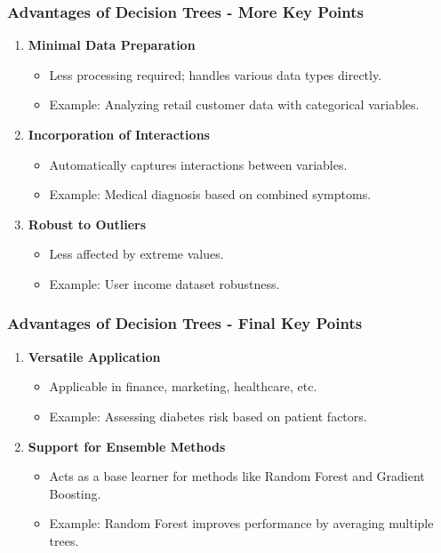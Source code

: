 \documentclass[aspectratio=169]{beamer}
\begin{document}
\begin{frame}[fragile]
    \frametitle{Advantages of Decision Trees - More Key Points}
    \begin{enumerate}[resume]
        \item \textbf{Minimal Data Preparation}
        \begin{itemize}
            \item Less processing required; handles various data types directly.
            \item Example: Analyzing retail customer data with categorical variables.
        \end{itemize}

        \item \textbf{Incorporation of Interactions}
        \begin{itemize}
            \item Automatically captures interactions between variables.
            \item Example: Medical diagnosis based on combined symptoms.
        \end{itemize}

        \item \textbf{Robust to Outliers}
        \begin{itemize}
            \item Less affected by extreme values.
            \item Example: User income dataset robustness.
        \end{itemize}
    \end{enumerate}
\end{frame}

\begin{frame}[fragile]
    \frametitle{Advantages of Decision Trees - Final Key Points}
    \begin{enumerate}[resume]
        \item \textbf{Versatile Application}
        \begin{itemize}
            \item Applicable in finance, marketing, healthcare, etc.
            \item Example: Assessing diabetes risk based on patient factors.
        \end{itemize}

        \item \textbf{Support for Ensemble Methods}
        \begin{itemize}
            \item Acts as a base learner for methods like Random Forest and Gradient Boosting.
            \item Example: Random Forest improves performance by averaging multiple trees.
        \end{itemize}
    \end{enumerate}
\end{frame}
\end{document}
